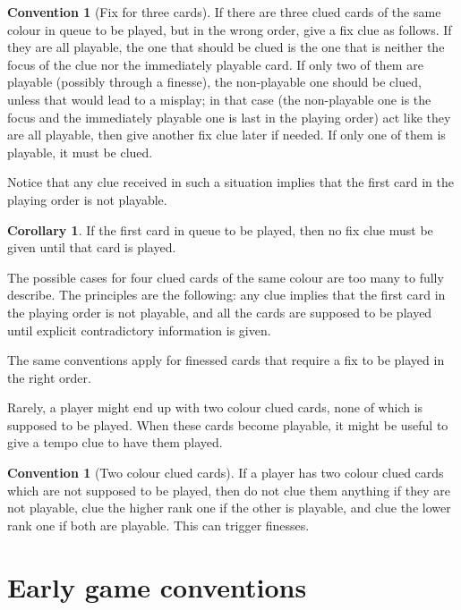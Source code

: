 \documentclass[a4paper]{article}
\theoremstyle{plain}
\theoremstyle{definition}
\newtheorem{corollary}[theorem]{Corollary}
\newtheorem{convention}[theorem]{Convention}
\begin{document}
\begin{convention}[Fix for three cards]
	If there are three clued cards of the same colour in queue to be played, but in the wrong order, give a fix clue as follows. If they are all playable, the one that should be clued is the one that is neither the focus of the clue nor the immediately playable card. If only two of them are playable (possibly through a finesse), the non-playable one should be clued, unless that would lead to a misplay; in that case (the non-playable one is the focus and the immediately playable one is last in the playing order) act like they are all playable, then give another fix clue later if needed. If only one of them is playable, it must be clued.
\end{convention}

Notice that any clue received in such a situation implies that the first card in the playing order is not playable.

\begin{corollary}
	If the first card in queue to be played, then no fix clue must be given until that card is played.
\end{corollary}

The possible cases for four clued cards of the same colour are too many to fully describe. The principles are the following: any clue implies that the first card in the playing order is not playable, and all the cards are supposed to be played until explicit contradictory information is given.

The same conventions apply for finessed cards that require a fix to be played in the right order.

Rarely, a player might end up with two colour clued cards, none of which is supposed to be played. When these cards become playable, it might be useful to give a tempo clue to have them played.

\begin{convention}[Two colour clued cards]
	If a player has two colour clued cards which are not supposed to be played, then do not clue them anything if they are not playable, clue the higher rank one if the other is playable, and clue the lower rank one if both are playable. This can trigger finesses.
\end{convention}

\section{Early game conventions}
\label{sec:early-game}
\end{document}
